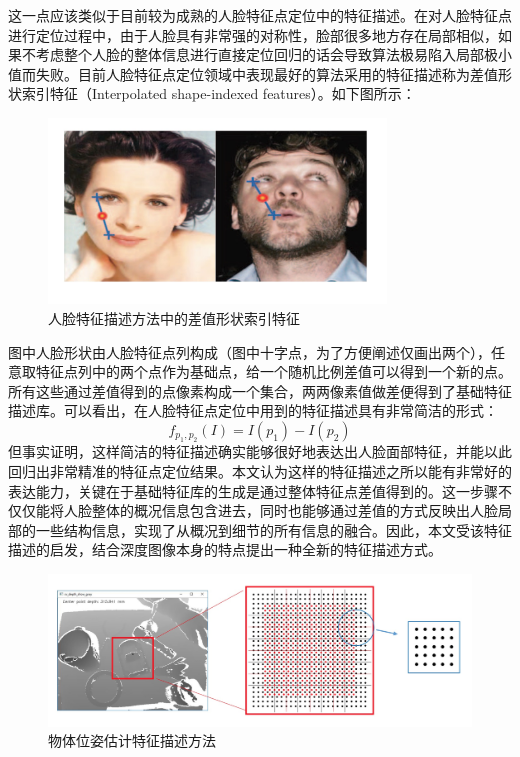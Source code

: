 这一点应该类似于目前较为成熟的人脸特征点定位中的特征描述。在对人脸特征点进行定位过程中，由于人脸具有非常强的对称性，脸部很多地方存在局部相似，如果不考虑整个人脸的整体信息进行直接定位回归的话会导致算法极易陷入局部极小值而失败。目前人脸特征点定位领域中表现最好的算法采用的特征描述称为差值形状索引特征（Interpolated shape-indexed features）\cite{burgos2013robust}。如下图所示：
\begin{figure}[htb]
	\centering 
	\includegraphics[width=0.8\textwidth]{./mypic/人脸特征描述方法.jpg} 
	\caption{人脸特征描述方法中的差值形状索引特征} 
\end{figure}
图中人脸形状由人脸特征点列构成（图中十字点，为了方便阐述仅画出两个），任意取特征点列中的两个点作为基础点，给一个随机比例差值可以得到一个新的点。所有这些通过差值得到的点像素构成一个集合，两两像素值做差便得到了基础特征描述库。可以看出，在人脸特征点定位中用到的特征描述具有非常简洁的形式：
\begin{equation}
	f_{p_1,p_2}(I)=I(p_1)-I(p_2)
\end{equation}
但事实证明，这样简洁的特征描述确实能够很好地表达出人脸面部特征，并能以此回归出非常精准的特征点定位结果。本文认为这样的特征描述之所以能有非常好的表达能力，关键在于基础特征库的生成是通过整体特征点差值得到的。这一步骤不仅仅能将人脸整体的概况信息包含进去，同时也能够通过差值的方式反映出人脸局部的一些结构信息，实现了从概况到细节的所有信息的融合。因此，本文受该特征描述的启发，结合深度图像本身的特点提出一种全新的特征描述方式。
\begin{figure}[htb]
	\centering 
	\includegraphics[width=\textwidth]{./mypic/物体位姿估计特征描述方法.jpg} 
	\caption{物体位姿估计特征描述方法} 
\end{figure}

